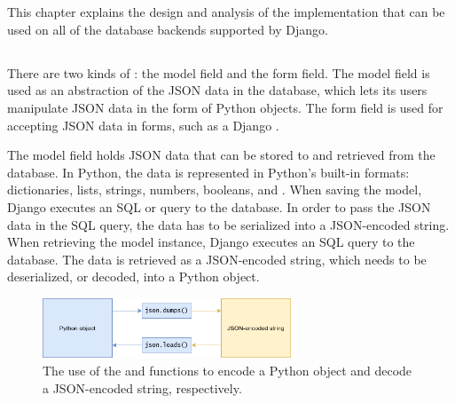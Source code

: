 \chapter{\babTiga}

This chapter explains the design and analysis of the 
implementation that can be used on all of the database backends supported by
Django.

\section{}

There are two kinds of : the model field and the form field.
The model field is used as an abstraction of the JSON data in the database,
which lets its users manipulate JSON data in the form of Python objects.
The form field is used for accepting JSON data in forms, such as a Django
.

The model field holds JSON data that can be stored to and retrieved from the
database. In Python, the data is represented in Python's built-in formats:
dictionaries, lists, strings, numbers, booleans, and . When saving
the model, Django executes an SQL  or  query to the
database. In order to pass the JSON data in the SQL query, the data has to be
serialized into a JSON-encoded string. When retrieving the model instance,
Django executes an SQL  query to the database. The data is
retrieved as a JSON-encoded string, which needs to be deserialized, or decoded,
into a Python object.

\begin{figure}
	\centering
    \includegraphics[width=0.66\textwidth]{pics/encodecode.png}
	\caption{The use of the  and 
	functions to encode a Python object and decode a JSON-encoded string,
	respectively.}
	\label{fig:encodecode}
\end{figure}

